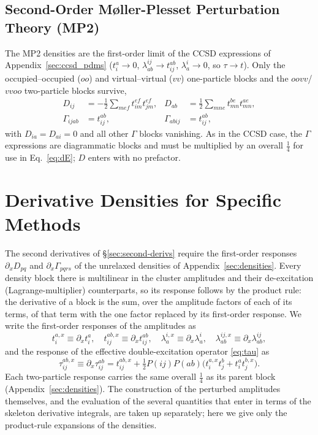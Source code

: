 \documentclass[12pt]{article}
\begin{document}
\subsection{Second-Order M{\o}ller-Plesset Perturbation Theory (MP2)}

The MP2 densities are the first-order limit of the CCSD expressions of Appendix~\ref{sec:ccsd_pdms}
($t_i^a\to0$, $\lambda^{ij}_{ab}\to t_{ij}^{ab}$, $\lambda^i_a\to0$, so $\tau\to t$).
Only the occupied--occupied ($oo$) and virtual--virtual ($vv$) one-particle blocks and the
$oovv$/$vvoo$ two-particle blocks survive,
\begin{align}
D_{ij} &= -\tfrac12\sum_{mef} t_{im}^{ef} t_{jm}^{ef}, &
D_{ab} &= \tfrac12\sum_{mne} t_{mn}^{be} t_{mn}^{ae}, \\
\Gamma_{ijab} &= t_{ij}^{ab}, &
\Gamma_{abij} &= t_{ij}^{ab},
\end{align}
with $D_{ia}=D_{ai}=0$ and all other $\Gamma$ blocks vanishing.  As in the CCSD
case, the $\Gamma$ expressions are diagrammatic blocks and must be multiplied by
an overall $\frac14$ for use in Eq.~\eqref{eq:dE}; $D$ enters with no prefactor.

\section{Derivative Densities for Specific Methods}
\label{sec:deriv-densities}

The second derivatives of \S\ref{sec:second-derivs} require the first-order
responses $\partial_x D_{pq}$ and $\partial_x\Gamma_{pqrs}$ of the unrelaxed
densities of Appendix~\ref{sec:densities}.  Every density block there is
multilinear in the cluster amplitudes and their de-excitation
(Lagrange-multiplier) counterparts, so its response follows by the product rule:
the derivative of a block is the sum, over the amplitude factors of each of its
terms, of that term with the one factor replaced by its first-order response.  We
write the first-order responses of the amplitudes as
\begin{equation*}
t^{a,x}_i\equiv\partial_x t^a_i,\quad
t^{ab,x}_{ij}\equiv\partial_x t^{ab}_{ij},\quad
\lambda^{i,x}_a\equiv\partial_x\lambda^i_a,\quad
\lambda^{ij,x}_{ab}\equiv\partial_x\lambda^{ij}_{ab},
\end{equation*}
and the response of the effective double-excitation operator \eqref{eq:tau} as
\begin{equation}
\tau^{ab,x}_{ij} \equiv \partial_x\tau^{ab}_{ij}
= t^{ab,x}_{ij} + \tfrac12 P(ij)P(ab)\big(t^{a,x}_i t^b_j + t^a_i t^{b,x}_j\big).
\label{eq:tau-x}
\end{equation}
Each two-particle response carries the same overall $\frac14$ as its parent block
(Appendix~\ref{sec:densities}).  The construction of the perturbed amplitudes
themselves, and the evaluation of the several quantities that enter in terms of
the skeleton derivative integrals, are taken up separately; here we give only the
product-rule expansions of the densities.
\end{document}
